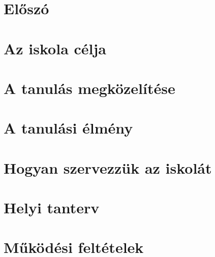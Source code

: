 \documentclass[10pt,openright,twoside]{book}
\begin{document}
\let\apageref\pageref
\let\autocite\citep


\pagestyle{empty}




\tableofcontents
\mainmatter
\pagestyle{fancy}
\chapter*{Előszó}
\vspace*{-2ex}

\chapter{Az iskola célja}






\chapter{A tanulás megközelítése}





\chapter{A tanulási élmény}










\chapter{Hogyan szervezzük az iskolát}











\chapter{Helyi tanterv}









\vspace*{-.8ex}

\vspace*{-.8ex}

% 
\chapter{Működési feltételek}


\backmatter

\end{document}
